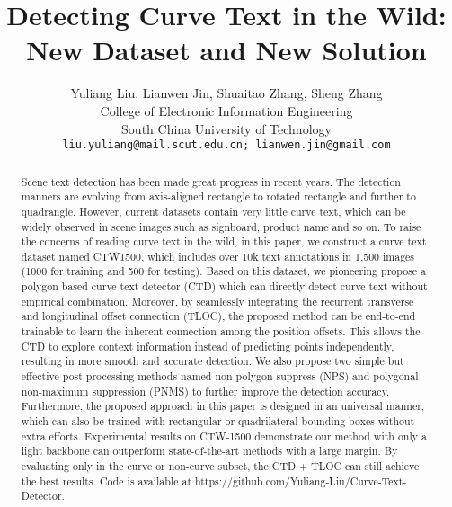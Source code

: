 \documentclass[10pt,twocolumn,letterpaper]{article}
\begin{document}
\title{Detecting Curve Text in the Wild: New Dataset and New Solution}

\author{Yuliang Liu, Lianwen Jin, Shuaitao Zhang, Sheng Zhang\\
College of Electronic Information Engineering\\
South China University of Technology \\
{\tt\small liu.yuliang@mail.scut.edu.cn; lianwen.jin@gmail.com}
}

\maketitle


\begin{abstract}
  Scene text detection has been made great progress in recent years. The detection manners are evolving from axis-aligned rectangle to rotated rectangle and further to quadrangle. However, current datasets contain very little curve text, which can be widely observed in scene images such as signboard, product name and so on. To raise the concerns of reading curve text in the wild, in this paper, we construct a curve text dataset named CTW1500, which includes over 10k text annotations in 1,500 images (1000 for training and 500 for testing). Based on this dataset, we pioneering propose a polygon based curve text detector (CTD) which can directly detect curve text without empirical combination. Moreover, by seamlessly integrating the recurrent transverse and longitudinal offset connection (TLOC), the proposed method can be end-to-end trainable to learn the inherent connection among the position offsets. This allows the CTD to explore context information instead of predicting points independently, resulting in more smooth and accurate detection. We also propose two simple but effective post-processing methods named non-polygon suppress (NPS) and polygonal non-maximum suppression (PNMS) to further improve the detection accuracy. Furthermore, the proposed approach in this paper is designed in an universal manner, which can also be trained with rectangular or quadrilateral bounding boxes without extra efforts. Experimental results on CTW-1500 demonstrate our method with only a light backbone can outperform state-of-the-art methods with a large margin. By evaluating only in the curve or non-curve subset, the CTD + TLOC can still achieve the best results. Code is available at {\color{blue} https://github.com/Yuliang-Liu/Curve-Text-Detector}.
\end{abstract}
\end{document}
